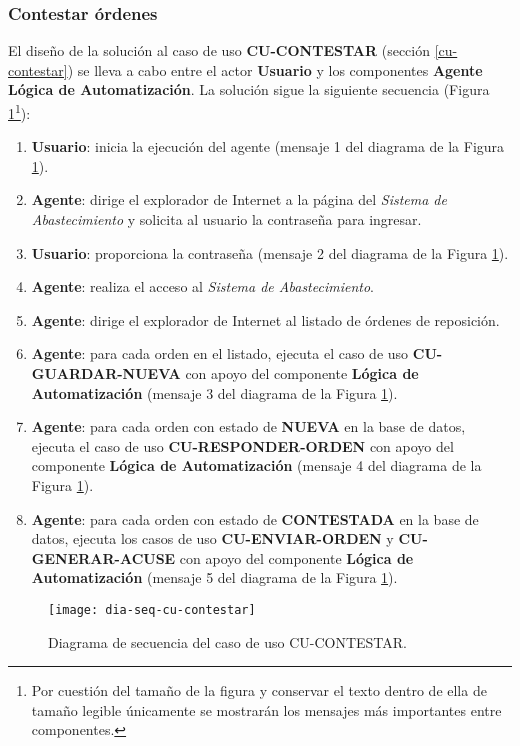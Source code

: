 \subsubsection{Contestar órdenes}
El diseño de la solución al caso de uso \textbf{CU-CONTESTAR} (sección \ref{cu-contestar}) se lleva a cabo entre el actor \textbf{Usuario} y los componentes \textbf{Agente} \textbf{Lógica de Automatización}. La solución sigue la siguiente secuencia (Figura \ref{fig:dia-seq-cu-contestar}\footnote{Por cuestión del tamaño de la figura y conservar el texto dentro de ella de tamaño legible únicamente se mostrarán los mensajes más importantes entre componentes.}):
\begin{enumerate}
	\item \textbf{Usuario}: inicia la ejecución del agente (mensaje 1 del diagrama de la Figura \ref{fig:dia-seq-cu-contestar}).
	\item \textbf{Agente}: dirige el explorador de Internet a la página del \textit{Sistema de Abastecimiento} y solicita al usuario la contraseña para ingresar.
	\item \textbf{Usuario}: proporciona la contraseña (mensaje 2 del diagrama de la Figura \ref{fig:dia-seq-cu-contestar}).
	\item \textbf{Agente}: realiza el acceso al \textit{Sistema de Abastecimiento}.
	\item \textbf{Agente}: dirige el explorador de Internet al listado de órdenes de reposición.
	\item \textbf{Agente}: para cada orden en el listado, ejecuta el caso de uso \textbf{CU-GUARDAR-NUEVA} con apoyo del componente \textbf{Lógica de Automatización} (mensaje 3 del diagrama de la Figura \ref{fig:dia-seq-cu-contestar}).
	\item \textbf{Agente}: para cada orden con estado de \textbf{NUEVA} en la base de datos, ejecuta el caso de uso \textbf{CU-RESPONDER-ORDEN} con apoyo del componente \textbf{Lógica de Automatización} (mensaje 4 del diagrama de la Figura \ref{fig:dia-seq-cu-contestar}).
	\item \textbf{Agente}: para cada orden con estado de \textbf{CONTESTADA} en la base de datos, ejecuta los casos de uso \textbf{CU-ENVIAR-ORDEN} y \textbf{CU-GENERAR-ACUSE} con apoyo del componente \textbf{Lógica de Automatización} (mensaje 5 del diagrama de la Figura \ref{fig:dia-seq-cu-contestar}).
\end{enumerate}

\begin{figure}[h]
	\centering
	\texttt{[image: dia-seq-cu-contestar]}
	\caption{Diagrama de secuencia del caso de uso CU-CONTESTAR.}
	\label{fig:dia-seq-cu-contestar}
\end{figure}

